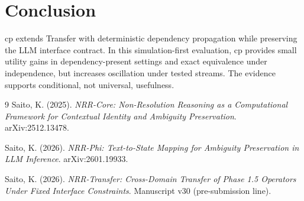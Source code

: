 \documentclass[11pt,a4paper]{article}
\begin{document}
\section{Conclusion}
cp extends Transfer with deterministic dependency propagation while preserving the LLM interface contract. In this simulation-first evaluation, cp provides small utility gains in dependency-present settings and exact equivalence under independence, but increases oscillation under tested streams. The evidence supports conditional, not universal, usefulness.

\begin{thebibliography}{9}
Saito, K. (2025).
\textit{NRR-Core: Non-Resolution Reasoning as a Computational Framework for Contextual Identity and Ambiguity Preservation}.
arXiv:2512.13478.

Saito, K. (2026).
\textit{NRR-Phi: Text-to-State Mapping for Ambiguity Preservation in LLM Inference}.
arXiv:2601.19933.

Saito, K. (2026).
\textit{NRR-Transfer: Cross-Domain Transfer of Phase 1.5 Operators Under Fixed Interface Constraints}.
Manuscript v30 (pre-submission line).
\end{thebibliography}
\end{document}
